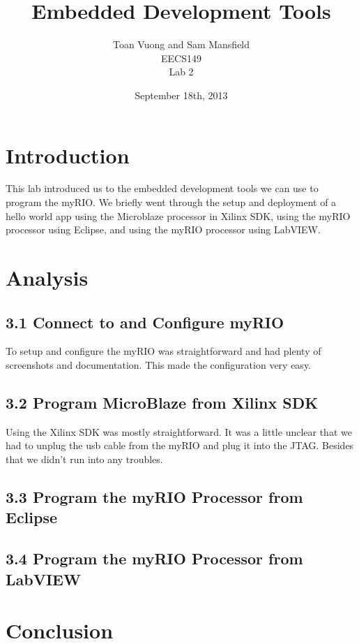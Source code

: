 \documentclass[10pt]{article}
\begin{document}
\title{Embedded Development Tools}
\author{Toan Vuong and Sam Mansfield\\
        EECS149\\
        Lab 2}
\date{September 18th, 2013}
\maketitle

\section*{Introduction}
  This lab introduced us to the embedded development tools we can use to program the myRIO. We briefly went through the setup and deployment of a hello world app using the Microblaze processor in Xilinx SDK, using the myRIO processor using Eclipse, and using the myRIO processor using LabVIEW.
\section*{Analysis}
  \subsection*{3.1 Connect to and Configure myRIO}
    To setup and configure the myRIO was straightforward and had plenty of screenshots and documentation. This made the configuration very easy.
  \subsection*{3.2 Program MicroBlaze from Xilinx SDK}
    Using the Xilinx SDK was mostly straightforward. It was a little unclear that we had to unplug the usb cable from the myRIO and plug it into the JTAG. Besides that we didn't run into any troubles.
  \subsection*{3.3 Program the myRIO Processor from Eclipse}
  \subsection*{3.4 Program the myRIO Processor from LabVIEW}
\section*{Conclusion}
\end{document}

